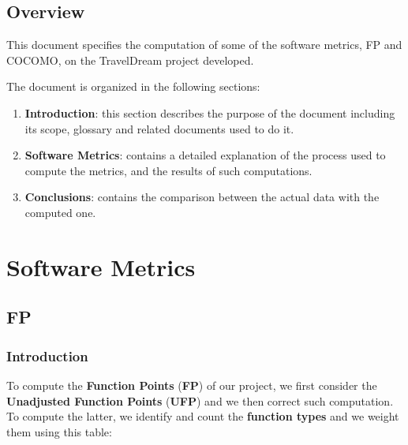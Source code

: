 \documentclass[a4paper,12pt]{book}
\begin{document}
\section{Overview}
This document specifies the computation of some of the software metrics, FP and COCOMO, on the TravelDream project developed.\newline

The document is organized in the following sections:
\begin{enumerate}
  \item \textbf{Introduction}: this section describes the purpose of the document including its scope, glossary and related documents used to do it.
  \item \textbf{Software Metrics}: contains a detailed explanation of the process used to compute the metrics, and the results of such computations.
  \item \textbf{Conclusions}: contains the comparison between the actual data with the computed one.
\end{enumerate}

\chapter{Software Metrics}

\section{FP}

\subsection{Introduction}
To compute the \textbf{Function Points} (\textbf{FP}) of our project, we first consider the \textbf{Unadjusted Function Points} (\textbf{UFP}) and we then correct such computation. To compute the latter, we identify and count the \textbf{function types} and we weight them using this table:
\end{document}
